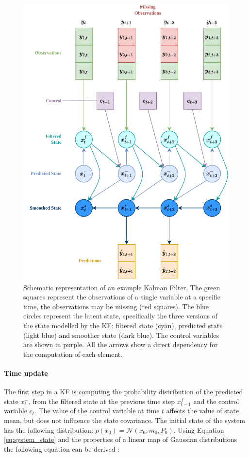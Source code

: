 \documentclass{article}
\newcommand{\norm}[3]{\mathcal{N}\left(#1; #2, #3\right)} %
\begin{document}
\begin{figure}
\centerline{\includegraphics[width=4.5in]{Kalman Filter figure}}
\caption{Schematic representation of an example Kalman Filter. The green squares represent the observations of a single variable at a specific time, the observations may be missing (red squares). The blue circles represent the latent state, specifically the three versions of the state modelled by the KF: filtered state (cyan), predicted state (light blue) and smoother state (dark blue). The control variables are shown in purple.
All the arrows show a direct dependency for the computation of each element.}
\label{fig:kalman_filter}
\end{figure}

\paragraph{Time update}

The first step in a KF is computing the probability distribution of the predicted state $x^-_t$, from the filtered state at the previous time step $x^f_{t-1}$ and the control variable $c_t$.
The value of the control variable at time $t$ affects the value of state mean, but does not influence the state covariance.
The initial state of the system has the following distribution: $p(x_0) = \norm{x_0}{m_0}{P_0}$. Using Equation \ref{eq:system_state} and the properties of a linear map of Gaussian distributions the following equation can be derived \cite{bishop_pattern_2006, 2020_hennig_pml}:
\end{document}
